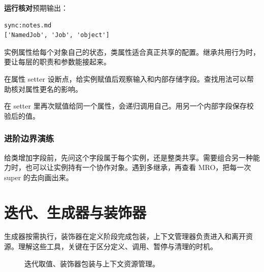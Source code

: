 \documentclass[UTF8,a4paper,oneside,openany,fontset=none,11pt]{ctexbook}
\begin{document}
\textbf{运行核对}\enspace 预期输出：
\begin{lstlisting}[language={},numbers=none]
sync:notes.md
['NamedJob', 'Job', 'object']
\end{lstlisting}

\par

\begin{myunderstanding}
实例属性给每个对象自己的状态，类属性适合真正共享的配置。继承共用行为时，要让每层的职责和参数能接起来。
\end{myunderstanding}

\begin{pycharmpractice}
在属性 setter 设断点，给实例赋值后观察输入和内部存储字段。查找用法可以帮助核对属性更名的影响。
\end{pycharmpractice}

\begin{pitfall}
在 setter 里再次赋值给同一个属性，会递归调用自己。用另一个内部字段保存校验后的值。
\end{pitfall}

\subsection*{进阶边界演练}
给类增加字段前，先问这个字段属于每个实例，还是整类共享。需要组合另一种能力时，也可以让实例持有一个协作对象。遇到多继承，再查看 MRO，把每一次 super 的去向画出来。

\chapter{迭代、生成器与装饰器}
\label{ch:06-outline}

生成器按需执行，装饰器在定义阶段完成包装，上下文管理器负责进入和离开资源。理解这些工具，关键在于区分定义、调用、暂停与清理的时机。


\begin{figure}[htbp]
  \centering
  \caption*{迭代取值、装饰器包装与上下文资源管理。}
\end{figure}
\end{document}
